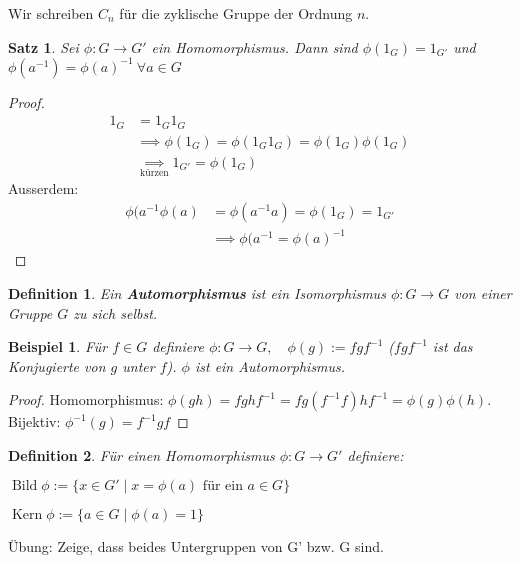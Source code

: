 \documentclass{article}
\theoremstyle{plain}
\newtheorem{definition}{Definition}
\newtheorem{theorem}{Satz}
\newtheorem{beispiel}{Beispiel}
\renewcommand{\ker}{\mathop{\mathrm{Kern}}}
\newcommand{\bild}{\mathop{\mathrm{Bild}}}
\newcommand{\defn}[1]{\textbf{#1}}
\newcommand{\defeq}{:=}
\begin{document}
Wir schreiben $C_n$ für die zyklische Gruppe der Ordnung $n$.

\begin{theorem}
    Sei $\phi\colon G\to G'$ ein Homomorphismus. Dann sind $\phi(1_G)=1_{G'}$ und $\phi(a^{-1})=\phi(a)^{-1}\ \forall a\in G$
\end{theorem}
\begin{proof}
\begin{align*}
    1_G&=1_G1_G\\
    &\implies \phi(1_G)=\phi(1_G1_G)=\phi(1_G)\phi(1_G)\\
    &\underset{\text{kürzen}}{\implies}1_{G'}=\phi(1_G)
\end{align*}
Ausserdem: 
\begin{align*}
    \phi(a^{-1}\phi(a) &= \phi(a^{-1}a)=\phi(1_G)=1_{G'}\\
    &\implies \phi(a^{-1}=\phi(a)^{-1}
\end{align*}
\end{proof}

\begin{definition}
    Ein \defn{Automorphismus} ist ein Isomorphismus $\phi\colon G\to G$ von einer Gruppe $G$ zu sich selbst.
\end{definition}

\begin{beispiel}
    Für $f\in G$ definiere $\phi\colon G\to G,\quad \phi(g)\defeq fgf^{-1}$ ($fgf^{-1}$ ist das Konjugierte von $g$ unter $f$).
    $\phi$ ist ein Automorphismus.
\end{beispiel}
\begin{proof}
    Homomorphismus: $\phi(gh)=fghf^{-1}=fg(f^{-1}f)hf^{-1}=\phi(g)\phi(h)$.
    Bijektiv: $\phi^{-1}(g)=f^{-1}gf$
\end{proof}

\begin{definition}
    Für einen Homomorphismus $\phi\colon G\to G'$ definiere:

    $\bild\phi\defeq \{x\in G'\mid x=\phi(a) \text{ für ein } a\in G\}$

    $\ker\phi\defeq \{a\in G\mid \phi(a)=1\}$
\end{definition}
Übung: Zeige, dass beides Untergruppen von G' bzw. G sind.
\end{document}
